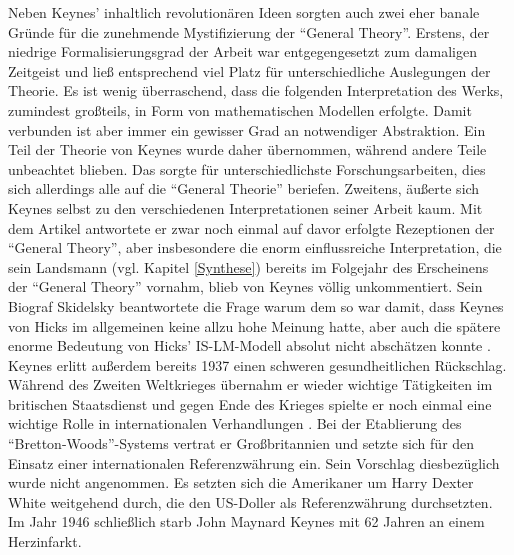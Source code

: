 Neben Keynes' inhaltlich revolutionären Ideen sorgten auch zwei eher banale Gründe für die zunehmende Mystifizierung der "`General Theory"'. Erstens, der niedrige Formalisierungsgrad der Arbeit war entgegengesetzt zum damaligen Zeitgeist und ließ entsprechend viel Platz für unterschiedliche Auslegungen der Theorie. Es ist wenig überraschend, dass die folgenden Interpretation des Werks, zumindest großteils, in Form von mathematischen Modellen erfolgte. Damit verbunden ist aber immer ein gewisser Grad an notwendiger Abstraktion. Ein Teil der Theorie von Keynes wurde daher übernommen, während andere Teile unbeachtet blieben. Das sorgte für unterschiedlichste Forschungsarbeiten, dies sich allerdings alle auf die "`General Theorie"' beriefen. Zweitens, äußerte sich Keynes selbst zu den verschiedenen Interpretationen seiner Arbeit kaum. Mit dem Artikel \textcite{Keynes1937} antwortete er zwar noch einmal auf davor erfolgte Rezeptionen der "`General Theory"', aber insbesondere die enorm einflussreiche Interpretation, die sein Landsmann \textcite{Hicks1937} (vgl. Kapitel \ref{Synthese}) bereits im Folgejahr des Erscheinens der "`General Theory"' vornahm, blieb von Keynes völlig unkommentiert. Sein Biograf Skidelsky \parencite{Snowdon2005} beantwortete die Frage warum dem so war damit, dass Keynes von Hicks im allgemeinen keine allzu hohe Meinung hatte, aber auch die spätere enorme Bedeutung von Hicks' IS-LM-Modell absolut nicht abschätzen konnte \parencite[S. 96]{Snowdon2005}. Keynes erlitt außerdem bereits 1937 einen schweren gesundheitlichen Rückschlag. Während des Zweiten Weltkrieges übernahm er wieder wichtige Tätigkeiten im britischen Staatsdienst und gegen Ende des Krieges spielte er noch einmal eine wichtige Rolle in internationalen Verhandlungen \parencite[S. 277]{Scherf1989}. Bei der Etablierung des "`Bretton-Woods"'-Systems vertrat er Großbritannien und setzte sich für den Einsatz einer internationalen Referenzwährung ein. Sein Vorschlag diesbezüglich wurde nicht angenommen. Es setzten sich die Amerikaner um Harry Dexter White weitgehend durch, die den US-Doller als Referenzwährung durchsetzten. Im Jahr 1946 schließlich starb John Maynard Keynes mit 62 Jahren an einem Herzinfarkt.

